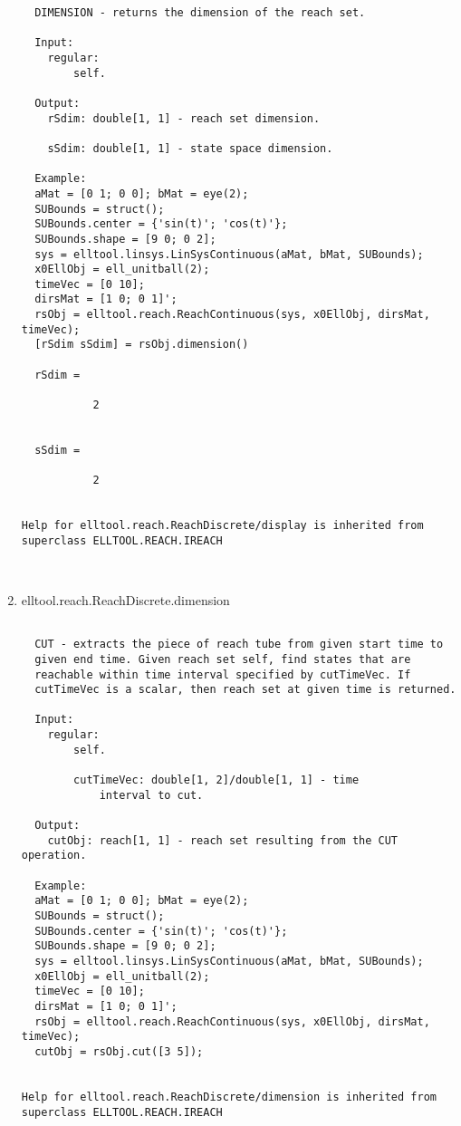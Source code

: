 \begin{enumerate}
\begin{lstlisting}
  DIMENSION - returns the dimension of the reach set.

  Input:
    regular:
        self.

  Output:
    rSdim: double[1, 1] - reach set dimension.

    sSdim: double[1, 1] - state space dimension.

  Example:
  aMat = [0 1; 0 0]; bMat = eye(2);
  SUBounds = struct();
  SUBounds.center = {'sin(t)'; 'cos(t)'};
  SUBounds.shape = [9 0; 0 2];
  sys = elltool.linsys.LinSysContinuous(aMat, bMat, SUBounds);
  x0EllObj = ell_unitball(2);
  timeVec = [0 10];
  dirsMat = [1 0; 0 1]';
  rsObj = elltool.reach.ReachContinuous(sys, x0EllObj, dirsMat, timeVec);
  [rSdim sSdim] = rsObj.dimension()

  rSdim =

           2


  sSdim =

           2


Help for elltool.reach.ReachDiscrete/display is inherited from superclass ELLTOOL.REACH.IREACH



\end{lstlisting}
\fontfamily{\familydefault}
\selectfont
\item {elltool.reach.ReachDiscrete.dimension}
\selectfont
\begin{lstlisting}

  CUT - extracts the piece of reach tube from given start time to
  given end time. Given reach set self, find states that are
  reachable within time interval specified by cutTimeVec. If
  cutTimeVec is a scalar, then reach set at given time is returned.

  Input:
    regular:
        self.

        cutTimeVec: double[1, 2]/double[1, 1] - time
            interval to cut.

  Output:
    cutObj: reach[1, 1] - reach set resulting from the CUT operation.

  Example:
  aMat = [0 1; 0 0]; bMat = eye(2);
  SUBounds = struct();
  SUBounds.center = {'sin(t)'; 'cos(t)'};
  SUBounds.shape = [9 0; 0 2];
  sys = elltool.linsys.LinSysContinuous(aMat, bMat, SUBounds);
  x0EllObj = ell_unitball(2);
  timeVec = [0 10];
  dirsMat = [1 0; 0 1]';
  rsObj = elltool.reach.ReachContinuous(sys, x0EllObj, dirsMat, timeVec);
  cutObj = rsObj.cut([3 5]);


Help for elltool.reach.ReachDiscrete/dimension is inherited from superclass ELLTOOL.REACH.IREACH




\end{lstlisting}
\end{enumerate}

